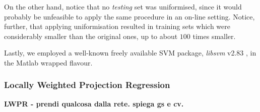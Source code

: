 On the other hand, notice that no \emph{testing} set was uniformised,
since it would probably be unfeasible to apply the same procedure in
an on-line setting. Notice, further, that applying uniformisation
resulted in training sets which were considerably smaller than the
original ones, up to about $100$ times smaller.

Lastly, we employed a well-known freely available SVM package,
\emph{libsvm} v2.83 \cite{...}, in the Matlab wrapped flavour.

\subsubsection{Locally Weighted Projection Regression}

\textbf{LWPR - prendi qualcosa dalla rete. spiega gs e cv.}

